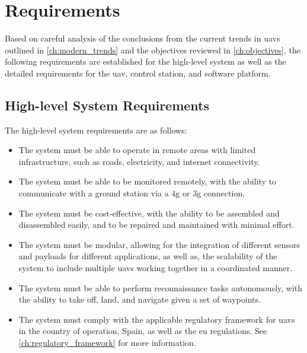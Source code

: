 \chapter{Requirements}\label{ch:requirements}

Based on careful analysis of the conclusions from the current trends in \glspl{uav} outlined in \cref{ch:modern_trends} and the objectives reviewed in \cref{ch:objectives}, the following requirements are established for the high-level system as well as the detailed requirements for the \gls{uav}, control station, and software platform.

\section{High-level System Requirements}

The high-level system requirements are as follows:

\begin{itemize}
  \item The system must be able to operate in remote areas with limited infrastructure, such as roads, electricity, and internet connectivity.

  \item The system must be able to be monitored remotely, with the ability to communicate with a ground station via a \gls{4g} or \gls{3g} connection.

  \item The system must be cost-effective, with the ability to be assembled and disassembled easily, and to be repaired and maintained with minimal effort.

  \item The system must be modular, allowing for the integration of different sensors and payloads for different applications, as well as, the scalability of the system to include multiple \glspl{uav} working together in a coordinated manner.

  \item The system must be able to perform reconnaissance tasks autonomously, with the ability to take off, land, and navigate given a set of waypoints.

  \item The system must comply with the applicable regulatory framework for \glspl{uav} in the country of operation, Spain, as well as the \gls{eu} regulations. See \cref{ch:regulatory_framework} for more information.
\end{itemize}

